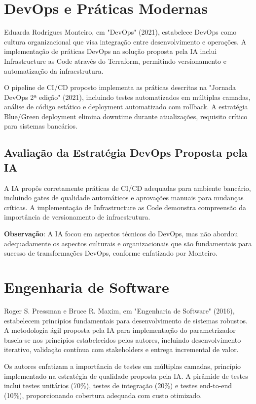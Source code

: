 \section{DevOps e Práticas Modernas}

Eduarda Rodrigues Monteiro, em "DevOps" (2021), estabelece DevOps como cultura organizacional que visa integração entre desenvolvimento e operações. A implementação de práticas DevOps na solução proposta pela IA inclui Infrastructure as Code através do Terraform, permitindo versionamento e automatização da infraestrutura.

O pipeline de CI/CD proposto implementa as práticas descritas na "Jornada DevOps 2ª edição" (2021), incluindo testes automatizados em múltiplas camadas, análise de código estático e deployment automatizado com rollback. A estratégia Blue/Green deployment elimina downtime durante atualizações, requisito crítico para sistemas bancários.

\subsection{Avaliação da Estratégia DevOps Proposta pela IA}

A IA propôs corretamente práticas de CI/CD adequadas para ambiente bancário, incluindo gates de qualidade automáticos e aprovações manuais para mudanças críticas. A implementação de Infrastructure as Code demonstra compreensão da importância de versionamento de infraestrutura.

\textbf{Observação}: A IA focou em aspectos técnicos do DevOps, mas não abordou adequadamente os aspectos culturais e organizacionais que são fundamentais para sucesso de transformações DevOps, conforme enfatizado por Monteiro.

\section{Engenharia de Software}

Roger S. Pressman e Bruce R. Maxim, em "Engenharia de Software" (2016), estabelecem princípios fundamentais para desenvolvimento de sistemas robustos. A metodologia ágil proposta pela IA para implementação do parametrizador baseia-se nos princípios estabelecidos pelos autores, incluindo desenvolvimento iterativo, validação contínua com stakeholders e entrega incremental de valor.

Os autores enfatizam a importância de testes em múltiplas camadas, princípio implementado na estratégia de qualidade proposta pela IA. A pirâmide de testes inclui testes unitários (70\%), testes de integração (20\%) e testes end-to-end (10\%), proporcionando cobertura adequada com custo otimizado.

